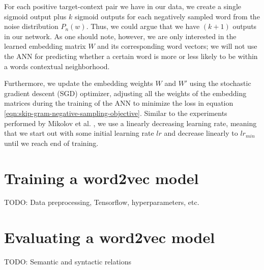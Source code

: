 \noindent
For each positive target-context pair we have in our data, we create a single sigmoid output plus $k$ sigmoid outputs for each negatively sampled word from the noise distribution $P_n(w)$. Thus, we could argue that we have $(k + 1)$ outputs in our network. As one should note, however, we are only interested in the learned embedding matrix $W$ and its corresponding word vectors; we will not use the ANN for predicting whether a certain word is more or less likely to be within a words contextual neighborhood.

\noindent
Furthermore, we update the embedding weights $W$ and $W'$ using the stochastic gradient descent (SGD) optimizer, adjusting all the weights of the embedding matrices during the training of the ANN to minimize the loss in equation \ref{eqn:skip-gram-negative-sampling-objective}. Similar to the experiments performed by Mikolov et al. \cite{mikolov2013a}, we use a linearly decreasing learning rate, meaning that we start out with some initial learning rate $lr$ and decrease linearly to $lr_{min}$ until we reach end of training.

\section{Training a word2vec model}
TODO: Data preprocessing, Tensorflow, hyperparameters, etc.

\section{Evaluating a word2vec model}
TODO: Semantic and syntactic relations